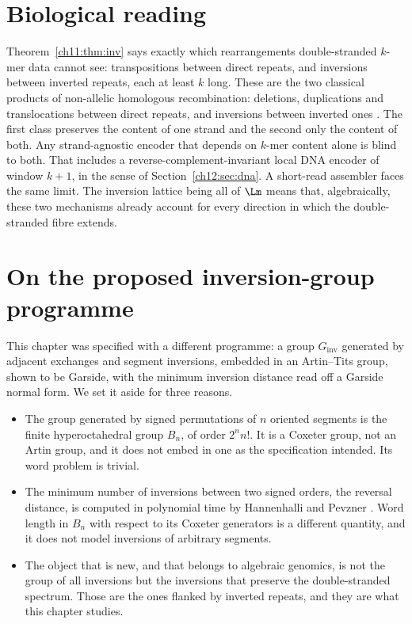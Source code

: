 \section{Biological reading}\label{ch11:sec:bio}

Theorem~\ref{ch11:thm:inv} says exactly which rearrangements double-stranded $k$-mer data cannot see:
transpositions between direct repeats, and inversions between inverted repeats, each at least $k$ long.
These are the two classical products of non-allelic homologous recombination: deletions,
duplications and translocations between direct repeats, and inversions between inverted ones
\cite{SL02}. The first class preserves the content of one strand and the second only the content of
both. Any strand-agnostic encoder that depends on $k$-mer content alone is blind to both. That includes
a reverse-complement-invariant local DNA encoder of window $k+1$, in the sense of
Section~\ref{ch12:sec:dna}. A short-read assembler faces the same limit. The inversion lattice being
all of $\Lm$ means that, algebraically, these two mechanisms already account for every direction in
which the double-stranded fibre extends.

\section{On the proposed inversion-group programme}\label{ch11:sec:programme}

This chapter was specified with a different programme: a group $G_{\mathrm{inv}}$ generated by adjacent
exchanges and segment inversions, embedded in an Artin--Tits group, shown to be Garside, with the
minimum inversion distance read off a Garside normal form. We set it aside for three reasons.
\begin{itemize}
\item The group generated by signed permutations of $n$ oriented segments is the finite hyperoctahedral
group $B_n$, of order $2^nn!$. It is a Coxeter group, not an Artin group, and it does not embed in one
as the specification intended. Its word problem is trivial.
\item The minimum number of inversions between two signed orders, the reversal distance, is computed in
polynomial time by Hannenhalli and Pevzner \cite{HP99}. Word length in $B_n$ with respect to its
Coxeter generators is a different quantity, and it does not model inversions of arbitrary segments.
\item The object that is new, and that belongs to algebraic genomics, is not the group of all inversions
but the inversions that preserve the double-stranded spectrum. Those are the ones flanked by inverted
repeats, and they are what this chapter studies.
\end{itemize}

